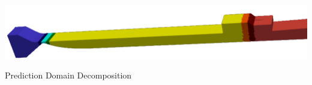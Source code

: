 \begin{frame}
\begin{minipage}[t][0.4\textheight][t]{\textwidth}
\centering
\includegraphics[width=.9\textwidth]{Figures/mtc/1dpartshiny.png}\\
\begin{center}
Prediction Domain Decomposition
\end{center}
\end{minipage}
\end{frame}


